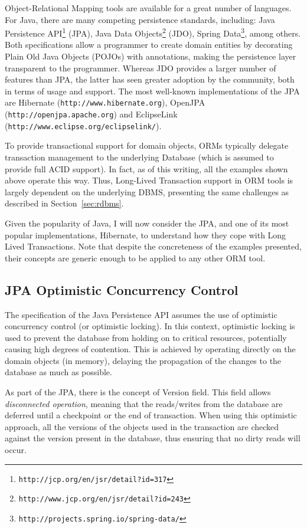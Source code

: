 Object-Relational Mapping tools are available for a great number of
languages. For Java, there are many competing persistence standards,
including: Java Persistence
API\footnote{\texttt{http://jcp.org/en/jsr/detail?id=317}} (JPA), Java
Data
Objects\footnote{\texttt{http://www.jcp.org/en/jsr/detail?id=243}}
(JDO), Spring
Data\footnote{\texttt{http://projects.spring.io/spring-data/}}, among
others. Both specifications allow a programmer to create domain
entities by decorating Plain Old Java Objects (POJOs) with
annotations, making the persistence layer transparent to the
programmer. Whereas JDO provides a larger number of features than JPA,
the latter has seen greater adoption by the community, both in terms
of usage and support. The most well-known implementations of the JPA
are Hibernate (\texttt{http://www.hibernate.org}), OpenJPA
(\texttt{http://openjpa.apache.org}) and EclipseLink
(\texttt{http://www.eclipse.org/eclipselink/}).

To provide transactional support for domain objects, ORMs typically
delegate transaction management to the underlying Database (which is
assumed to provide full ACID support). In fact, as of this writing,
all the examples shown above operate this way. Thus, Long-Lived
Transaction support in ORM tools is largely dependent on the
underlying DBMS, presenting the same challenges as described in
Section~\ref{sec:rdbms}.

Given the popularity of Java, I will now consider the JPA, and one of
its most popular implementations, Hibernate, to understand how they
cope with Long Lived Transactions. Note that despite the concreteness
of the examples presented, their concepts are generic enough to be
applied to any other ORM tool.

\subsection{JPA Optimistic Concurrency Control}

The specification of the Java Persistence API assumes the use of
optimistic concurrency control (or optimistic locking). In this
context, optimistic locking is used to prevent the database from
holding on to critical resources, potentially causing high degrees of
contention.  This is achieved by operating directly on the domain
objects (in memory), delaying the propagation of the changes to the
database as much as possible.

As part of the JPA, there is the concept of Version field. This field
allows {\it disconnected operation}, meaning that the reads/writes
from the database are deferred until a checkpoint or the end of
transaction. When using this optimistic approach, all the versions of
the objects used in the transaction are checked against the version
present in the database, thus ensuring that no dirty reads will occur.

